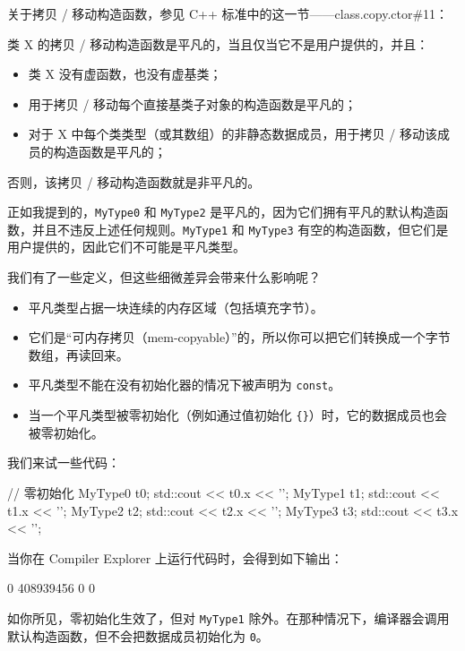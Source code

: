 关于拷贝 / 移动构造函数，参见 C++ 标准中的这一节——class.copy.ctor\#11：

\begin{myQuote}
类 X 的拷贝 / 移动构造函数是平凡的，当且仅当它不是用户提供的，并且：

\begin{itemize}
\item 类 X 没有虚函数，也没有虚基类；
\item 用于拷贝 / 移动每个直接基类子对象的构造函数是平凡的；
\item 对于 X 中每个类类型（或其数组）的非静态数据成员，用于拷贝 / 移动该成员的构造函数是平凡的；
\end{itemize}

否则，该拷贝 / 移动构造函数就是非平凡的。
\end{myQuote}

正如我提到的，\texttt{MyType0} 和 \texttt{MyType2} 是平凡的，因为它们拥有平凡的默认构造函数，并且不违反上述任何规则。\texttt{MyType1} 和 \texttt{MyType3} 有空的构造函数，但它们是用户提供的，因此它们不可能是平凡类型。

我们有了一些定义，但这些细微差异会带来什么影响呢？

\begin{itemize}
\item 平凡类型占据一块连续的内存区域（包括填充字节）。
\item 它们是“可内存拷贝（mem-copyable）”的，所以你可以把它们转换成一个字节数组，再读回来。
\item 平凡类型不能在没有初始化器的情况下被声明为 \texttt{const}。
\item 当一个平凡类型被零初始化（例如通过值初始化 \texttt{\{\}}）时，它的数据成员也会被零初始化。
\end{itemize}

我们来试一些代码：

\begin{codebox}[cpp]
// 零初始化
MyType0 t0{};
std::cout << t0.x << '\n';
MyType1 t1{};
std::cout << t1.x << '\n';
MyType2 t2{};
std::cout << t2.x << '\n';
MyType3 t3{};
std::cout << t3.x << '\n';
\end{codebox}

当你在 Compiler Explorer 上运行代码时，会得到如下输出：

\begin{codebox}[cpp]
0
408939456
0
0
\end{codebox}

如你所见，零初始化生效了，但对 \texttt{MyType1} 除外。在那种情况下，编译器会调用默认构造函数，但不会把数据成员初始化为 \texttt{0}。


